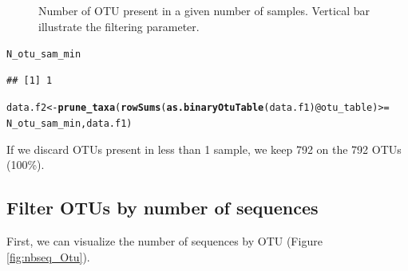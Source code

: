 \documentclass[12pt]{article}\usepackage[]{graphicx}\usepackage[]{color}
\makeatletter
\newcommand{\hlopt}[1]{\textcolor[rgb]{0,0,0}{#1}}%
\newcommand{\hlstd}[1]{\textcolor[rgb]{0.345,0.345,0.345}{#1}}%
\newcommand{\hlkwb}[1]{\textcolor[rgb]{0.69,0.353,0.396}{#1}}%
\newcommand{\hlkwc}[1]{\textcolor[rgb]{0.333,0.667,0.333}{#1}}%
\newcommand{\hlkwd}[1]{\textcolor[rgb]{0.737,0.353,0.396}{\textbf{#1}}}%
\newenvironment{kframe}{%
 \def\at@end@of@kframe{}%
 \ifinner\ifhmode%
  \def\at@end@of@kframe{\end{minipage}}%
  \begin{minipage}{\columnwidth}%
 \fi\fi%
 \def\FrameCommand##1{\hskip\@totalleftmargin \hskip-\fboxsep
 \colorbox{shadecolor}{##1}\hskip-\fboxsep
     \hskip-\linewidth \hskip-\@totalleftmargin \hskip\columnwidth}%
 \MakeFramed {\advance\hsize-\width
   \@totalleftmargin\z@ \linewidth\hsize
   \@setminipage}}%
 {\par\unskip\endMakeFramed%
 \at@end@of@kframe}
\newenvironment{knitrout}{}{} %
\numberwithin{figure}{section}
\makeatother
\begin{document}
\begin{knitrout}
\begin{figure}
{}

\caption[Number of OTU present in a given number of samples]{Number of OTU present in a given number of samples. Vertical bar illustrate the filtering parameter.}\label{fig:nbOtu_sample}
\end{figure}


\end{knitrout}

\begin{knitrout}\small
{}\color{fgcolor}\begin{kframe}
\begin{alltt}
\hlstd{N_otu_sam_min}
\end{alltt}
\begin{verbatim}
## [1] 1
\end{verbatim}
\end{kframe}
\end{knitrout}

\begin{knitrout}\small
{}\color{fgcolor}\begin{kframe}
\begin{alltt}
\hlstd{data.f2} \hlkwb{<-} \hlkwd{prune_taxa}\hlstd{(}\hlkwd{rowSums}\hlstd{(}\hlkwd{as.binaryOtuTable}\hlstd{(data.f1)}\hlopt{@}\hlkwc{otu_table}\hlstd{)} \hlopt{>=}
                        \hlstd{N_otu_sam_min, data.f1)}
\end{alltt}
\end{kframe}
\end{knitrout}

If we discard OTUs present in less than 1 sample, we keep 792 on the 792 OTUs (100\%).

 \subsection{Filter OTUs by number of sequences}

 First, we can visualize the number of sequences by OTU (Figure \ref{fig:nbseq_Otu}).
\end{document}
